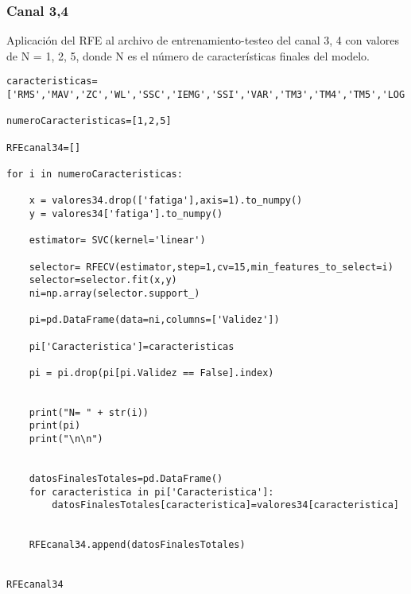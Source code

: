         \subsubsection{Canal 3,4}
Aplicación del RFE al archivo de entrenamiento-testeo del canal 3, 4 con valores de N = 1, 2, 5, donde N es el número de características finales del modelo.
\begin{lstlisting}
caracteristicas=['RMS','MAV','ZC','WL','SSC','IEMG','SSI','VAR','TM3','TM4','TM5','LOG','ACC','MNF','MDF']

numeroCaracteristicas=[1,2,5]

RFEcanal34=[]

for i in numeroCaracteristicas:
    
    x = valores34.drop(['fatiga'],axis=1).to_numpy()
    y = valores34['fatiga'].to_numpy()

    estimator= SVC(kernel='linear')

    selector= RFECV(estimator,step=1,cv=15,min_features_to_select=i)
    selector=selector.fit(x,y)
    ni=np.array(selector.support_)

    pi=pd.DataFrame(data=ni,columns=['Validez'])

    pi['Caracteristica']=caracteristicas

    pi = pi.drop(pi[pi.Validez == False].index)

    
    print("N= " + str(i))
    print(pi)
    print("\n\n")

    
    datosFinalesTotales=pd.DataFrame()
    for caracteristica in pi['Caracteristica']:
        datosFinalesTotales[caracteristica]=valores34[caracteristica]


    RFEcanal34.append(datosFinalesTotales)


RFEcanal34
\end{lstlisting}
\newpage
